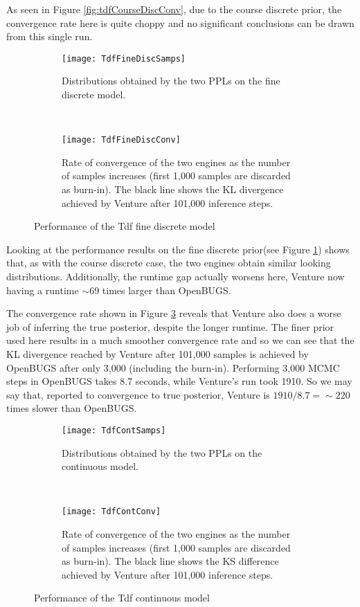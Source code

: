 As seen in Figure \ref{fig:tdfCourseDiscConv}, due to the course discrete prior, the convergence rate here is quite choppy and no significant conclusions can be drawn from this single run. 


\begin{figure}[h]
    \centering
    \begin{subfigure}[t]{0.48\textwidth}
      \texttt{[image: TdfFineDiscSamps]}
      \caption{Distributions obtained by the two PPLs on the fine discrete model.}
      \label{fig:tdfFineDiscSamp}
    \end{subfigure}
    ~
    \begin{subfigure}[t]{0.48\textwidth}
      \texttt{[image: TdfFineDiscConv]}
      \caption{Rate of convergence of the two engines as the number of samples increases (first 1,000 samples are discarded as burn-in). The black line shows the KL divergence achieved by Venture after 101,000 inference steps.}
      \label{fig:tdfFineDiscConv}
    \end{subfigure}
    \caption{Performance of the Tdf fine discrete model}
\end{figure}

Looking at the performance results on the fine discrete prior(see Figure \ref{fig:tdfFineDiscSamp}) shows that, as with the course discrete case, the two engines obtain similar looking distributions. Additionally, the runtime gap actually worsens here, Venture now having a runtime $\sim$69 times larger than OpenBUGS.

The convergence rate shown in Figure \ref{fig:tdfFineDiscConv} reveals that Venture also does a worse job of inferring the true posterior, despite the longer runtime. The finer prior used here results in a much smoother convergence rate and so we can see that the KL divergence reached by Venture after 101,000 samples is achieved by OpenBUGS after only 3,000 (including the burn-in). Performing 3,000 MCMC steps in OpenBUGS takes 8.7 seconds, while Venture's run took 1910. So we may say that, reported to convergence to true posterior, Venture is $1910/8.7 = \sim 220$ times slower than OpenBUGS.

\begin{figure}[h]
    \centering
    \begin{subfigure}[t]{0.48\textwidth}
      \texttt{[image: TdfContSamps]}
      \caption{Distributions obtained by the two PPLs on the continuous model.}
      \label{fig:tdfContSamp}
    \end{subfigure}
    ~
    \begin{subfigure}[t]{0.48\textwidth}
      \texttt{[image: TdfContConv]}
      \caption{Rate of convergence of the two engines as the number of samples increases (first 1,000 samples are discarded as burn-in). The black line shows the KS difference achieved by Venture after 101,000 inference steps.}
      \label{fig:tdfContConv}
    \end{subfigure}
    \caption{Performance of the Tdf continuous model}
\end{figure}


